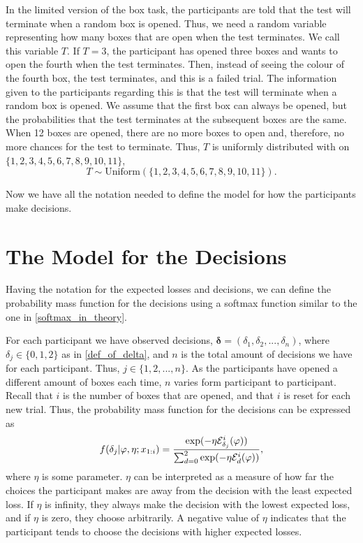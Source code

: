 In the limited version of the box task, the participants are told that the test will terminate when a random box is opened. Thus, we need a random variable representing how many boxes that are open when the test terminates. We call this variable $T$. If $T=3$, the participant has opened three boxes and wants to open the fourth when the test terminates. Then, instead of seeing the colour of the fourth box, the test terminates, and this is a failed trial. The information given to the participants regarding this is that the test will terminate when a random box is opened. We assume that the first box can always be opened, but the probabilities that the test terminates at the subsequent boxes are the same. When 12 boxes are opened, there are no more boxes to open and, therefore, no more chances for the test to terminate. Thus, $T$ is uniformly distributed with on $\{1,2,3,4,5,6,7,8,9,10,11\}$, 
\begin{equation}
\label{T_uniform}
    T \sim \text{Uniform}(\{1,2,3,4,5,6,7,8,9,10,11\}).
\end{equation}

Now we have all the notation needed to define the model for how the participants make decisions.



\section{The Model for the Decisions}
Having the notation for the expected losses and decisions, we can define the probability mass function for the decisions using a softmax function similar to the one in \eqref{softmax_in_theory}. 

For each participant we have observed decisions, $\boldsymbol{\delta}=(\delta_1,\delta_2,...,\delta_n)$, where $\delta_j \in \{0,1,2 \}$ as in \eqref{def_of_delta}, and $n$ is the total amount of decisions we have for each participant. Thus, $j\in \{1,2,...,n \}$. As the participants have opened a different amount of boxes each time, $n$ varies form participant to participant. Recall that $i$ is the number of boxes that are opened, and that $i$ is reset for each new trial. Thus, the probability mass function for the decisions can be expressed as
\begin{equation}
\label{softmax_theta}
    f(\delta_{j}|\varphi,\eta;x_{1:i}) = \frac{\text{exp}(- \eta \mathcal{E}^i_{\delta_{j}}(\varphi))}{\sum_{d=0}^{2} \text{exp}(-\eta \mathcal{E}^i_{d}(\varphi))},
\end{equation}
where $\eta$ is some parameter. $\eta$ can be interpreted as a measure of how far the choices the participant makes are away from the decision with the least expected loss. If $\eta$ is infinity, they always make the decision with the lowest expected loss, and if $\eta$ is zero, they choose arbitrarily. A negative value of $\eta$ indicates that the participant tends to choose the decisions with higher expected losses.


